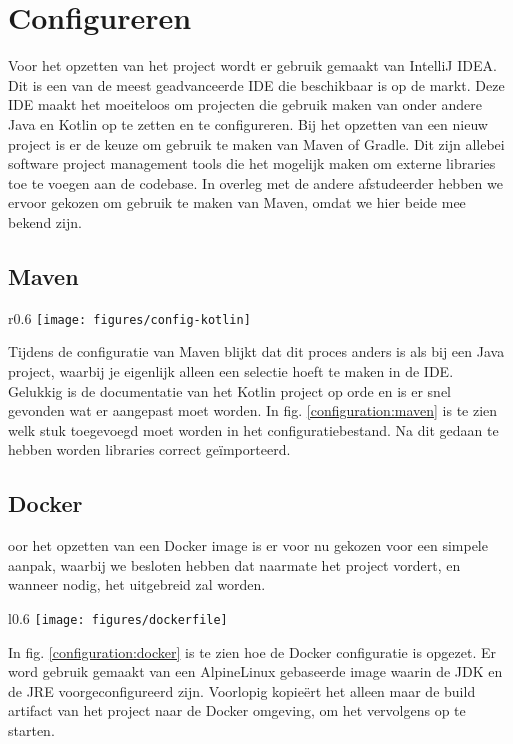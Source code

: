 \section{Configureren}

Voor het opzetten van het project wordt er gebruik gemaakt van IntelliJ IDEA. Dit is een van de meest geadvanceerde \gls{IDE} die beschikbaar is op de markt. Deze \acrshort{IDE} maakt het moeiteloos om projecten die gebruik maken van onder andere Java en Kotlin op te zetten en te configureren. Bij het opzetten van een nieuw project is er de keuze om gebruik te maken van Maven of Gradle. Dit zijn allebei software project management tools die het mogelijk maken om externe libraries toe te voegen aan de codebase. In overleg met de andere afstudeerder hebben we ervoor gekozen om gebruik te maken van Maven, omdat we hier beide mee bekend zijn.

\subsection{Maven}

\begin{wrapfigure}[11]{r}{0.6\textwidth}
    \texttt{[image: figures/config-kotlin]}
    \caption[Configuratie Maven]{Configuratie Maven in een Kotlin project afkomstig van ``Using Maven'' - \cite{kotlin_maven}.}
    \label{configuration:maven}
\end{wrapfigure} 

Tijdens de configuratie van Maven blijkt dat dit proces anders is als bij een Java project, waarbij je eigenlijk alleen een selectie hoeft te maken in de \acrshort{IDE}. Gelukkig is de documentatie van het Kotlin project op orde en is er snel gevonden wat er aangepast moet worden. In fig. \ref{configuration:maven} is te zien welk stuk toegevoegd moet worden in het configuratiebestand. Na dit gedaan te hebben worden libraries correct geïmporteerd.

\subsection{Docker}
oor het opzetten van een Docker image is er voor nu gekozen voor een simpele aanpak, waarbij we besloten hebben dat naarmate het project vordert, en wanneer nodig, het uitgebreid zal worden.

\begin{wrapfigure}[8]{l}{0.6\textwidth}
    \texttt{[image: figures/dockerfile]}
    \caption[Configuratie Docker]{Opgestelde configuratie voor de Dockerfile.}
    \label{configuration:docker}
\end{wrapfigure} 

In fig. \ref{configuration:docker} is te zien hoe de Docker configuratie is opgezet. Er word gebruik gemaakt van een AlpineLinux gebaseerde image waarin de \acrfull{JDK} en de \acrfull{JRE} voorgeconfigureerd zijn. Voorlopig kopieërt het alleen maar de build artifact van het project naar de Docker omgeving, om het vervolgens op te starten.
